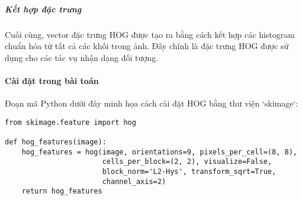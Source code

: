 \documentclass[a4paper,12pt]{article}
\begin{document}
\subparagraph{Kết hợp đặc trưng}
\hspace{5mm}Cuối cùng, vector đặc trưng HOG được tạo ra bằng cách kết hợp các histogram chuẩn hóa từ tất cả các khối trong ảnh. Đây chính là đặc trưng HOG được sử dụng cho các tác vụ nhận dạng đối tượng.

\paragraph{Cài đặt trong bài toán}
\hspace{5mm}Đoạn mã Python dưới đây minh họa cách cài đặt HOG bằng thư viện `skimage`:

\begin{verbatim}
from skimage.feature import hog

def hog_features(image):
    hog_features = hog(image, orientations=9, pixels_per_cell=(8, 8), 
                       cells_per_block=(2, 2), visualize=False, 
                       block_norm='L2-Hys', transform_sqrt=True, 
                       channel_axis=2)
    return hog_features
\end{verbatim}
\end{document}
